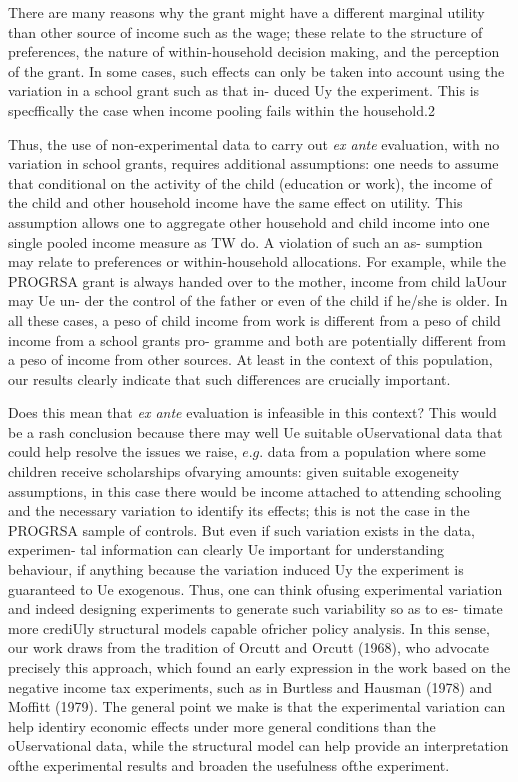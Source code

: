 There are many reasons why the grant might have a different marginal utility than other source of income such as the wage; these relate to the structure of preferences, the nature of within-household decision making, and the perception of the grant. In some cases, such effects can only be taken into account using the variation in a school grant such as that in- duced Uy the experiment. This is specffically the case when income pooling fails within the household.2

Thus, the use of non-experimental data to carry out {\it ex ante} evaluation, with no variation in school grants, requires additional assumptions: one needs to assume that conditional on the activity of the child (education or work), the income of the child and other household income have the same effect on utility. This assumption allows one to aggregate other household and child income into one single pooled income measure as TW do. A violation of such an as- sumption may relate to preferences or within-household allocations. For example, while the PROGRSA grant is always handed over to the mother, income from child laUour may Ue un- der the control of the father or even of the child if he/she is older. In all these cases, a peso of child income from work is different from a peso of child income from a school grants pro- gramme and both are potentially different from a peso of income from other sources. At least in the context of this population, our results clearly indicate that such differences are crucially important.

Does this mean that {\it ex ante} evaluation is infeasible in this context? This would be a rash conclusion because there may well Ue suitable oUservational data that could help resolve the issues we raise, $e.g$. data from a population where some children receive scholarships ofvarying amounts: given suitable exogeneity assumptions, in this case there would be income attached to attending schooling and the necessary variation to identify its effects; this is not the case in the PROGRSA sample of controls. But even if such variation exists in the data, experimen- tal information can clearly Ue important for understanding behaviour, if anything because the variation induced Uy the experiment is guaranteed to Ue exogenous. Thus, one can think ofusing experimental variation and indeed designing experiments to generate such variability so as to es- timate more crediUly structural models capable ofricher policy analysis. In this sense, our work draws from the tradition of Orcutt and Orcutt (1968), who advocate precisely this approach, which found an early expression in the work based on the negative income tax experiments, such as in Burtless and Hausman (1978) and Moffitt (1979). The general point we make is that the experimental variation can help identiry economic effects under more general conditions than the oUservational data, while the structural model can help provide an interpretation ofthe experimental results and broaden the usefulness ofthe experiment.

